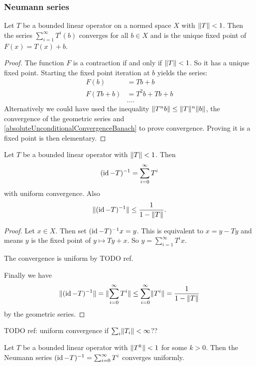 \subsubsection{Neumann series}
\begin{lemma}
Let $T$ be a bounded linear operator on a normed space $X$ with $\lVert T\rVert<1$. Then the series $\sum^\infty_{i=1}T^i(b)$ converges for all $b\in X$ and is the unique fixed point of $F(x) = T(x)+b$.
\end{lemma}
\begin{proof}
The function $F$ is a contraction if and only if $\lVert T\rVert<1$. So it has a unique fixed point. Starting the fixed point iteration at $b$ yields the series:
\begin{align*}
F(b) &= Tb + b \\
F(Tb+b) &= T^2b + Tb + b \\
&\hdots.
\end{align*}
Alternatively we could have used the inequality $\lVert T^nb\rVert \leq \lVert T\rVert^n\lVert b\rVert$, the convergence of the geometric series and \ref{absoluteUnconditionalConvergenceBanach} to prove convergence. Proving it is a fixed point is then elementary.
\end{proof}
\begin{corollary} \label{operatorNeumannSeries}
Let $T$ be a bounded linear operator with $\lVert T\rVert<1$. Then
\[ (\operatorname{id} - T)^{-1} = \sum_{i=0}^\infty T^i \]
with uniform convergence. Also
\[ \lVert(\operatorname{id} - T)^{-1}\rVert \leq \frac{1}{1-\lVert T\rVert}. \]
\end{corollary}
\begin{proof}
Let $x\in X$. Then set $(\operatorname{id} - T)^{-1}x = y$. This is equivalent to $x = y-Ty$ and means $y$ is the fixed point of $y\mapsto Ty+x$. So $y = \sum_{i=1}^\infty T^ix$.

The convergence is uniform by TODO ref.

Finally we have
\[ \lVert(\operatorname{id} - T)^{-1}\rVert = \lVert\sum_{i=0}^\infty T^i\rVert \leq \sum_{i=0}^\infty \lVert T^i\rVert = \frac{1}{1-\lVert T\rVert} \]
by the geometric series.
\end{proof}
TODO ref: uniform convergence if $\sum_i \lVert T_i\rVert < \infty$??
\begin{corollary} \label{operatorNeumannSeriesEventuallyContractive}
Let $T$ be a bounded linear operator with $\lVert T^k\rVert<1$ for some $k>0$. Then the Neumann series $(\operatorname{id} - T)^{-1} = \sum_{i=0}^\infty T^i$ converges uniformly.
\end{corollary}
